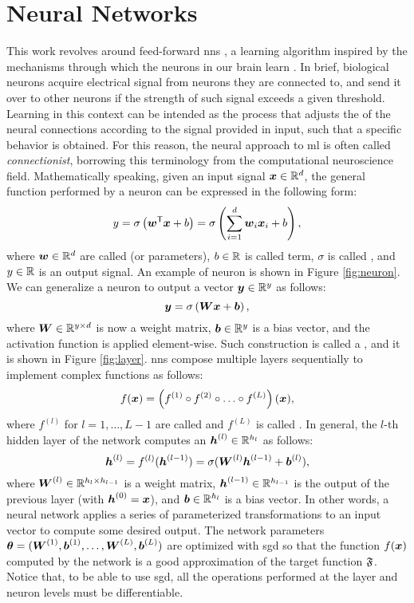 \section{Neural Networks}\label{sec:nn}
This work revolves around feed-forward \glspl{nn} \citep{haykin2009nnets,goodfellow2016dl}, a learning algorithm inspired by the mechanisms through which the neurons in our brain learn \citep{rosenblatt1958perceptron}. In brief, biological neurons acquire electrical signal from neurons they are connected to, and send it over to other neurons if the strength of such signal exceeds a given threshold. Learning in this context can be intended as the process that adjusts the  of the neural connections according to the signal provided in input, such that a specific behavior is obtained. For this reason, the neural approach to \gls{ml} is often called \emph{connectionist}, borrowing this terminology from the computational neuroscience field. Mathematically speaking, given an input signal $\Vector{x} \in \Real^d$, the general function performed by a neuron can be expressed in the following form:
$$y = \sigma\Par{\Vector{w}^{\Transpose} \Vector{x} + b} = \sigma\Par{\sum_{i=1}^d \Feature{w}{i} \Feature{x}{i} + b},$$
where $\Vector{w} \in \Real^d$ are called  (or parameters), $b \in \mathbb{R}$ is called  term, $\sigma$ is called , and $y \in \mathbb{R}$ is an output signal. An example of neuron is shown in Figure \ref{fig:neuron}. We can generalize a neuron to output a vector $\Vector{y} \in \Real^y$ as follows:
$$\Vector{y} = \sigma\Par{\Matrix{W} \Vector{x} + \Vector{b}},$$
where $\Matrix{W} \in \Real^{y \times d}$ is now a weight matrix, $\Vector{b} \in \Real^y$ is a bias vector, and the activation function is applied element-wise. Such construction is called a , and it is shown in Figure \ref{fig:layer}. \glspl{nn} compose multiple layers sequentially to implement complex functions as follows:
$$f(\Vector{x}) = \Par{f^{(1)} \circ f^{(2)} \circ \ldots \circ f^{(L)}}(\Vector{x}),$$
where $f^{(l)}$ for $l = 1, \ldots, L-1$ are called  and $f^{(L)}$ is called . In general, the $l$-th hidden layer of the network computes an  $\LayerVector{h}{l} \in \Real^{h_l}$ as follows:
$$ \LayerVector{h}{l} = f^{(l)}(\LayerVector{h}{l-1}) = \sigma(\LayerMatrix{W}{l} \LayerVector{h}{l-1} + \LayerVector{b}{l}),$$
where $\LayerMatrix{W}{l} \in \Real^{h_{l} \times h_{l-1}}$ is a weight matrix, $\LayerVector{h}{l-1} \in \Real^{h_{l-1}}$ is the output of the previous layer (with $\LayerVector{h}{0} = \Vector{x}$), and $\Vector{b} \in \Real^{h_l}$ is a bias vector. In other words, a neural network applies a series of parameterized transformations to an input vector to compute some desired output. The network parameters $\Param = (\LayerMatrix{W}{1}, \LayerVector{b}{1}, \ldots, \LayerMatrix{W}{L}, \LayerVector{b}{L})$ are optimized with \gls{sgd} so that the  function $f(\Vector{x})$ computed by the network is a good approximation of the target function $\mathfrak{F}$. Notice that, to be able to use \gls{sgd}, all the operations performed at the layer and neuron levels must be differentiable.
